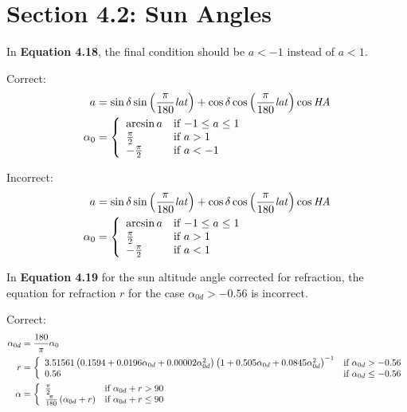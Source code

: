 \documentclass[report]{nrel}
\begin{document}
\section*{Section 4.2: Sun Angles}

In \textbf{Equation 4.18}, the final condition should be $a<-1$ instead of $a<1$.

Correct:
\begin{align*}
a &= \sin\delta \sin\left(\frac{\pi}{180}\mathit{lat}\right) + \cos\delta \cos\left(\frac{\pi}{180}\mathit{lat}\right) \cos\mathit{HA}\notag\\
\alpha_0 &=\left\{
  \begin{array}{ll}
    \arcsin a & \text{if $-1 \leq a \leq 1$}\\
    \frac{\pi}{2} & \text{if $a>1$}\\
    -\frac{\pi}{2} & \text{if $a<-1$}
  \end{array}
\right.
\end{align*}

Incorrect:
\begin{align*}
a &= \sin\delta \sin\left(\frac{\pi}{180}\mathit{lat}\right) + \cos\delta \cos\left(\frac{\pi}{180}\mathit{lat}\right) \cos\mathit{HA}\notag\\
\alpha_0 &=\left\{
  \begin{array}{ll}
    \arcsin a & \text{if $-1 \leq a \leq 1$}\\
    \frac{\pi}{2} & \text{if $a>1$}\\
    -\frac{\pi}{2} & \text{if $a<1$}
  \end{array}
\right.
\end{align*}

In \textbf{Equation 4.19} for the sun altitude angle corrected for refraction, the equation for refraction $r$ for the case $\alpha_{0d} > -0.56$ is incorrect.

Correct:
\begin{align*}\label{eqn-elvcorr}
\alpha_{0d} &= \frac{180}{\pi}\alpha_0\notag\\
r &= \left\{
\begin{array}{ll}
3.51561\left(0.1594 + 0.0196\alpha_{0d} + 0.00002\alpha_{0d}^2\right) \left(1 + 0.505\alpha_{0d} + 0.0845\alpha_{0d}^2\right)^{-1} & \text{if $\alpha_{0d}>-0.56$}\\
0.56 & \text{if $\alpha_{0d} \leq -0.56$}
\end{array}
\right.\notag\\
\alpha & = \left\{
\begin{array}{ll}
\frac{\pi}{2} & \text{if $\alpha_{0d} + r > 90$}\\
\frac{\pi}{180}\left(\alpha_{0d} + r\right) & \text{if $\alpha_{0d} + r \leq 90$}
\end{array}
\right.
\end{align*}
\end{document}
